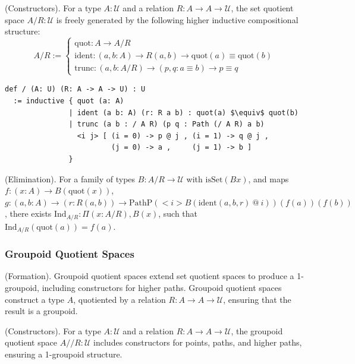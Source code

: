 \documentclass{article}
\begin{document}
\begin{definition} (Constructors).
For a type \( A : \mathcal{U} \) and a relation \( R : A \to A \to \mathcal{U} \),
the set quotient space \( A / R : \mathcal{U} \) is freely generated by the following
higher inductive compositional structure:
\[
A / R :=
\begin{cases}
\text{quot} : A \to A / R \\
\text{ident} : (a, b : A) \to R(a,b) \to \text{quot}(a) \equiv \text{quot}(b) \\
\text{trunc} : (a, b : A / R) \to (p, q : a \equiv b) \to p \equiv q
\end{cases}
\]
\begin{lstlisting}[mathescape=true]
def / (A: U) (R: A -> A -> U) : U
  := inductive { quot (a: A)
               | ident (a b: A) (r: R a b) : quot(a) $\equiv$ quot(b)
               | trunc (a b : / A R) (p q : Path (/ A R) a b)
                 <i j> [ (i = 0) -> p @ j , (i = 1) -> q @ j ,
                         (j = 0) -> a ,     (j = 1) -> b ]
               }
\end{lstlisting}
\end{definition}

\begin{theorem} (Elimination).
For a family of types \( B : A/R \to \mathcal{U} \) with \( \text{isSet}(B x) \),
and maps \( f : (x : A) \to B(\text{quot}(x)) \),
\( g : (a, b : A) \to (r : R(a,b)) \to \text{PathP} (<i> B(\text{ident}(a,b,r)\ @\ i)) (f(a)) (f(b)) \),
there exists \( \text{Ind}_{A/R} : \Pi (x: A/R), B(x) \), such that \( \text{Ind}_{A/R}(\text{quot}(a)) = f(a) \).
\end{theorem}

\subsubsection*{Groupoid Quotient Spaces}
\begin{definition} (Formation).
Groupoid quotient spaces extend set quotient spaces to produce a 1-groupoid,
including constructors for higher paths. Groupoid quotient spaces
construct a type \( A \), quotiented by a relation \( R : A \to A \to \mathcal{U} \),
ensuring that the result is a groupoid.
\end{definition}

\begin{definition} (Constructors).
For a type \( A : \mathcal{U} \) and a relation \( R : A \to A \to \mathcal{U} \),
the groupoid quotient space \( A // R : \mathcal{U} \) includes
constructors for points, paths, and higher paths, ensuring a 1-groupoid structure.
\end{definition}
\end{document}
